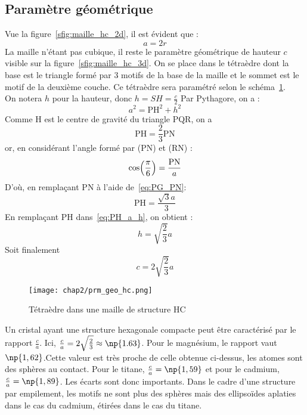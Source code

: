 \subsection{Paramètre géométrique}
Vue la figure~\ref{sfig:maille_hc_2d}, il est évident que :
\begin{equation}
    a = 2r \label{eq;a_r_hc}
\end{equation}
La maille n'étant pas cubique, il reste le paramètre géométrique
de hauteur $c$ visible sur la figure~\ref{sfig:maille_hc_3d}.
On se place dans le tétraèdre dont la base est le triangle formé
par 3 motifs de la base de la maille et le sommet est le motif
de la deuxième couche. Ce tétraèdre sera paramétré selon le
schéma~\ref{fig:prm_geo_hc}.\\
On notera $h$ pour la hauteur, donc $h = SH = \frac{c}{2}$
Par Pythagore, on a :
\begin{equation}
    a^2 = \text{PH}^2 + h^2 \label{eq:PH_a_h}
\end{equation}
Comme H est le centre de gravité du triangle PQR, on a
\begin{equation}
    \text{PH} = \frac{2}{3}\text{PN}\label{eq:PG_PN}
\end{equation}
or, en considérant l'angle formé par (PN) et (RN) :
\begin{equation*}
    \cos\Bigl( \frac{\pi}{6}\Bigr) = \frac{\text{PN}}{a}
\end{equation*}
D'où, en remplaçant PN à l'aide de~\ref{eq:PG_PN}:
\begin{equation}
    \text{PH} = \frac{\sqrt{3}a}{3}\label{eq:PH_a}
\end{equation}
En remplaçant PH dans~\ref{eq:PH_a_h}, on obtient :
\begin{equation*}
    h = \sqrt{\frac{2}{3}}a
\end{equation*}
Soit finalement
\begin{equation}
    \boxed{c=2\sqrt{\frac{2}{3}}a} \label{eq:c_hc}
\end{equation}
\begin{figure}
    \centering
    \texttt{[image: chap2/prm\_geo\_hc.png]}
    \caption{Tétraèdre dans une maille
        de structure HC}\label{fig:prm_geo_hc}
\end{figure}
\begin{rem}
    Un cristal ayant une structure hexagonale compacte
    peut être caractérisé par le rapport $\frac{c}{a}$.
    Ici, $\frac{c}{a} = 2\sqrt{\frac{2}{3}}\approx \np{1.63}$.
    Pour le magnésium, le rapport vaut
    $\np{1,62}$.Cette valeur est très proche de celle
    obtenue ci-dessus, les atomes sont des sphères
    au contact. Pour le titane, $\frac{c}{a}=\np{1,59}$ et pour
    le cadmium, $\frac{c}{a}=\np{1,89}$. Les écarts sont donc
    importants. Dans le cadre d’une structure par empilement,
    les motifs ne sont plus des sphères mais des ellipsoïdes
    aplaties dans le cas du cadmium, étirées dans le cas du titane.
\end{rem}

